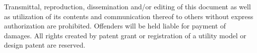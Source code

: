 Transmittal, reproduction, dissemination and/or editing of this document as well as utilization of its contents and communication thereof to others without express authorization are prohibited. 
Offenders will be held liable for payment of damages. All rights created by patent grant or registration of a utility model or design patent are reserved.
